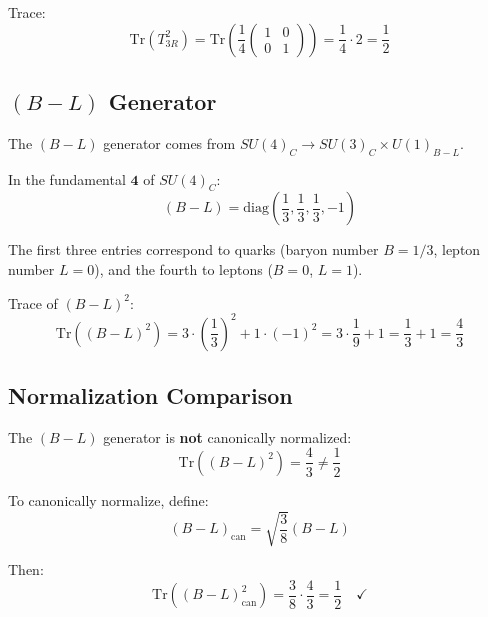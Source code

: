 \documentclass[11pt,a4paper]{article}
\begin{document}
Trace:
\begin{equation}
\label{eq:t3r-trace}
\mathrm{Tr}(T_{3R}^2) = \mathrm{Tr}\left(\frac{1}{4} \begin{pmatrix} 1 & 0 \\ 0 & 1 \end{pmatrix}\right) = \frac{1}{4} \cdot 2 = \frac{1}{2}
\end{equation}

\subsection{$(B-L)$ Generator}
\label{subsec:b-minus-l}

The $(B-L)$ generator comes from $SU(4)_C \to SU(3)_C \times U(1)_{B-L}$.

In the fundamental $\mathbf{4}$ of $SU(4)_C$:
\begin{equation}
\label{eq:b-minus-l-explicit}
(B-L) = \text{diag}\left(\frac{1}{3}, \frac{1}{3}, \frac{1}{3}, -1\right)
\end{equation}

The first three entries correspond to quarks (baryon number $B = 1/3$, lepton number $L = 0$),
and the fourth to leptons ($B = 0$, $L = 1$).

Trace of $(B-L)^2$:
\begin{equation}
\label{eq:b-minus-l-trace}
\mathrm{Tr}((B-L)^2) = 3 \cdot \left(\frac{1}{3}\right)^2 + 1 \cdot (-1)^2 = 3 \cdot \frac{1}{9} + 1 = \frac{1}{3} + 1 = \frac{4}{3}
\end{equation}

\subsection{Normalization Comparison}
\label{subsec:norm-compare}

The $(B-L)$ generator is \textbf{not} canonically normalized:
\begin{equation}
\label{eq:b-minus-l-not-canonical}
\mathrm{Tr}((B-L)^2) = \frac{4}{3} \neq \frac{1}{2}
\end{equation}

To canonically normalize, define:
\begin{equation}
\label{eq:b-minus-l-canonical}
(B-L)_{\text{can}} = \sqrt{\frac{3}{8}} (B-L)
\end{equation}

Then:
\begin{equation}
\label{eq:b-minus-l-canonical-trace}
\mathrm{Tr}((B-L)_{\text{can}}^2) = \frac{3}{8} \cdot \frac{4}{3} = \frac{1}{2} \quad \checkmark
\end{equation}
\end{document}
